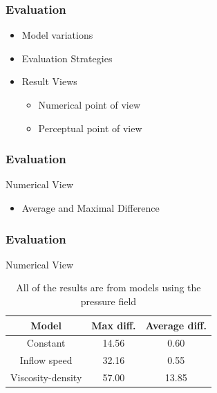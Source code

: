 \documentclass[18pt, xcolor=table]{beamer}
\begin{document}
\begin{frame}[t]
  \frametitle{Evaluation}
  \begin{itemize}
  \item Model variations
  \item Evaluation Strategies
  \item Result Views
    \begin{itemize}
    \item Numerical point of view
    \item Perceptual point of view
    \end{itemize}
  \end{itemize}
\end{frame}

\begin{frame}[t]
  \frametitle{Evaluation}
  \large{Numerical View}
  \begin{itemize}
  \item Average and Maximal Difference
  \end{itemize}

\end{frame}

\begin{frame}[t]
  \frametitle{Evaluation}
  \large{Numerical View}
  \vspace{1.5cm}
  \begin{center}
    \begin{table}
      \begin{tabular}{|c|c|c|}
        \hline
        \rowcolor{blue!50}
        \textbf{Model}    & \textbf{Max diff.} & \textbf{Average diff.} \\
        \hline
        Constant          & 14.56 & 0.60  \\
        Inflow speed      & 32.16 & 0.55  \\
        Viscosity-density & 57.00 & 13.85 \\
        \hline
      \end{tabular}
      \caption{All of the results are from models using the pressure field}
    \end{table}
  \end{center}

\end{frame}
\end{document}
